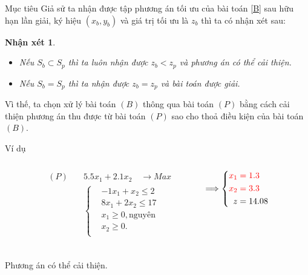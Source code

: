 \documentclass{beamer}
\newtheorem{nx}{Nhận xét}[section]
\begin{document}
\begin{frame}{Mục tiêu} %
Giả sử ta nhận được tập phương án tối ưu của bài toán \eqref{B} sau hữu hạn lần giải, ký hiệu $(x_b, y_b)$ và giá trị tối ưu là $z_b$ thì ta có nhận xét sau:
\begin{nx} \label{nx}
\begin{itemize}
\item Nếu $S_b \subset S_p$ thì ta luôn nhận được $z_b < z_p$ và phương án có thể cải thiện.
\item Nếu $S_b = S_p$ thì ta nhận được $z_b = z_p$ và bài toán được giải.
\end{itemize}    
\end{nx}
Vì thế, ta chọn xử lý bài toán $(B)$ thông qua bài toán $(P)$ bằng cách cải thiện phương án thu được từ bài toán $(P)$ sao cho thoả điều kiện của bài toán $(B)$.
\end{frame}

\begin{frame}{Ví dụ}
    \begin{columns}
    \begin{column}{0.1\textwidth}
    \end{column}
    \begin{column}{0.4\textwidth}
        \begin{equation*}
        \begin{split}
            (P) \quad & 5.5x_1 + 2.1x_2 \quad \longrightarrow Max \\
            & \left\{\begin{split}
            & -1x_1 + x_2 \leq 2 \\
            & 8x_1 + 2x_2 \leq 17 \\
            &x_1 \geq 0, \text{nguyên} \\
            &x_2 \geq 0. \\
            \end{split}\right. \\
        \end{split}
        \end{equation*}
    \end{column}
    \begin{column}{0.4\textwidth}
        \begin{equation*}
            \Longrightarrow
            \left\{\begin{split}
            \color{red} x_1 &\color{red} = 1.3 \\
            \color{red} x_2 &\color{red} = 3.3 \\
            z&=14.08
        \end{split}\right.
        \end{equation*}
    \end{column}
    \begin{column}{0.1\textwidth}
    \end{column}
    \end{columns}
    \vspace{1cm}
    \center
    \Large
    Phương án có thể cải thiện.
\end{frame}
\end{document}

